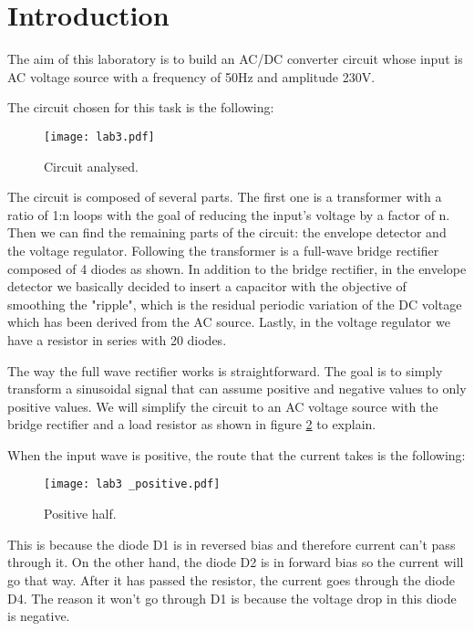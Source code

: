 \vspace{-0.25cm}
\section{Introduction}
\label{sec:introduction}
The aim of this laboratory is to build an AC/DC converter
circuit whose input is AC voltage source with a frequency of 50Hz
and amplitude 230V.

The circuit chosen for this task is the following:

\begin{figure}[h] \centering
    \texttt{[image: lab3.pdf]}
    \caption{Circuit analysed.}
    \label{fig:rc}
\end{figure}

The circuit is composed of several parts. The first one is a
transformer with a ratio of 1:n loops with the goal
of reducing the input's voltage by a factor of n.
Then we can find the remaining parts of the circuit: the envelope detector
and the voltage regulator.
Following the transformer is a full-wave bridge rectifier
composed of 4 diodes as shown.
In addition to the bridge rectifier, in the envelope detector we basically decided to insert a
capacitor with the objective of smoothing the "ripple", which is the residual
periodic variation of the DC voltage which has been derived from the AC source.
Lastly, in the voltage regulator we have a resistor in series with 20 diodes.


The way the full wave rectifier works is straightforward. The goal is to
simply transform a sinusoidal signal that can assume positive and negative values to only positive values.
We will simplify the circuit to an AC voltage source with the bridge rectifier and a load resistor as shown in figure \ref{fig:rc2} to explain.

When the input wave is positive, the route that the current takes is the following:
\begin{figure}[h] \centering
    \texttt{[image: lab3 \_positive.pdf]}
    \caption{Positive half.}
    \label{fig:rc2}
\end{figure}

This is because the diode D1 is in reversed bias and therefore
current can't pass through it. On the other hand, the diode D2 is in forward bias
so the current will go that way.
After it has passed the resistor, the current goes through the diode D4.
The reason it won't go through D1 is because the voltage drop in this diode
is negative.

